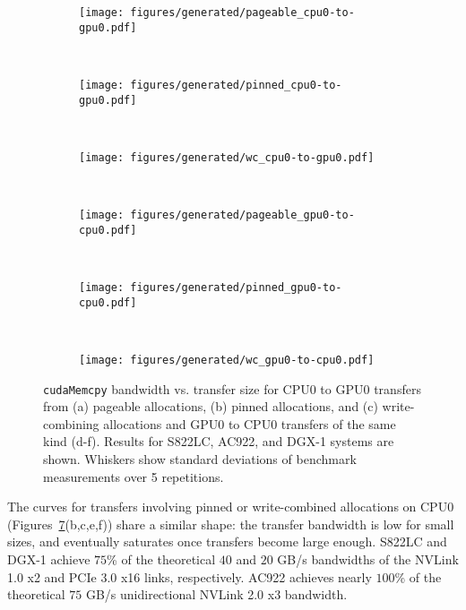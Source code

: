 \begin{figure}[H]
	\centering
	\begin{subfigure}[b]{0.3\textwidth}
		\texttt{[image: figures/generated/pageable\_cpu0-to-gpu0.pdf]}
		\caption{}
		\label{fig:pageable-cpu0-gpu0}
	\end{subfigure}
	~
	\begin{subfigure}[b]{0.3\textwidth}
		\texttt{[image: figures/generated/pinned\_cpu0-to-gpu0.pdf]}
		\caption{}
		\label{fig:pinned-cpu0-gpu0}
	\end{subfigure}
	~
	\begin{subfigure}[b]{0.3\textwidth}
		\texttt{[image: figures/generated/wc\_cpu0-to-gpu0.pdf]}
		\caption{}
		\label{fig:wc-cpu0-gpu0}
	\end{subfigure}
	\\
	\begin{subfigure}[b]{0.3\textwidth}
		\texttt{[image: figures/generated/pageable\_gpu0-to-cpu0.pdf]}
		\caption{}
		\label{fig:pageable-gpu0-cpu0}
	\end{subfigure}
	~
	\begin{subfigure}[b]{0.3\textwidth}
		\texttt{[image: figures/generated/pinned\_gpu0-to-cpu0.pdf]}
		\caption{}
		\label{fig:pinned-gpu0-cpu0}
	\end{subfigure}
	~
	\begin{subfigure}[b]{0.3\textwidth}
		\texttt{[image: figures/generated/wc\_gpu0-to-cpu0.pdf]}
		\caption{}
		\label{fig:wc-gpu0-cpu0}
	\end{subfigure}
	\caption[\texttt{cudaMemcpy} bandwidth for CPU0-GPU0 transfers]{
		\texttt{cudaMemcpy} bandwidth vs. transfer size for CPU0 to GPU0 transfers from 
		(a) pageable allocations,
		(b) pinned allocations, and
		(c) write-combining allocations and 
		GPU0 to CPU0 transfers of the same kind (d-f).
		Results for S822LC, AC922, and DGX-1 systems are shown.
		Whiskers show standard deviations of benchmark measurements over 5 repetitions.
	}
	\label{fig:pageable-pinned-wc}
\end{figure}


The curves for transfers involving pinned or write-combined allocations on CPU0 (Figures~\ref{fig:pageable-pinned-wc}(b,c,e,f)) share a similar shape: the transfer bandwidth is low for small sizes, and eventually saturates once transfers become large enough.
S822LC and DGX-1 achieve \mytilde $75$\% of the theoretical $40$ and $20$ GB/s bandwidths of the NVLink 1.0 x2 and PCIe 3.0 x16 links, respectively.
AC922 achieves nearly $100$\% of the theoretical $75$ GB/s unidirectional NVLink 2.0 x3 bandwidth.

